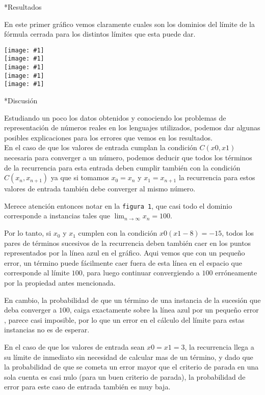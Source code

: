 \documentclass[12pt,titlepage]{article}
\newcommand{\gra}[1]{\noindent\texttt{[image: \#1]}\\}
\newenvironment{usection}[1]{\newpage\begin{section}*{#1}	\addcontentsline{toc}{section}{#1}}{\end{section}}
\begin{document}
	\begin{usection}{Resultados}

		En este primer gráfico vemos claramente cuales son los dominios
		del límite de la fórmula cerrada para los distintos límites
		que esta puede dar.

		\gra{lim5.png}
		
		\gra{fig_2_8_20.png}
		
		\gra{fig_4_4-25_20.png}
		
		\gra{fig_4_4-25_10.png}
		
		\gra{fig_5_5_20.png}

	\end{usection}
	
	\begin{usection}{Discusión}

		Estudiando un poco los datos obtenidos
		y conociendo los problemas de representación de números reales
		en los lenguajes utilizados, podemos dar algunas posibles explicaciones
		para los errores que vemos en los resultados. \\

		En el caso de que los valores de entrada cumplan la condición $C(x0,x1)$
		necesaria para converger a un número, podemos deducir que
		todos los términos de la recurrencia para esta entrada
		deben cumplir también con la condición $C(x_n,x_{n+1})$ ya que
		si tomamos $x_0 = x_n$ y $x_1 = x_{n+1}$ la recurrencia
		para estos valores de entrada también debe converger al mismo número.

		Merece atención entonces notar en la \texttt{figura 1},
		que casi todo el dominio corresponde a instancias
		tales que $\lim_{n\to\infty} x_n = 100$. 

		Por lo tanto, si $x_0$ y $x_1$ cumplen con la condición $x0(x1-8) = -15$,
		todos los pares de términos sucesivos de la recurrencia
		deben también caer en los puntos representados
		por la línea azul en el gráfico. Aqui vemos que con un pequeño error,
		un término puede fácilmente caer fuera de esta línea
		en el espacio que corresponde al límite $100$, para luego
		continuar convergiendo a $100$ erróneamente por la propiedad antes mencionada.

		En cambio, la probabilidad de que un término de una instancia
		de la sucesión que deba converger a $100$, caiga exactamente
		sobre la línea azul por un pequeño error , parece casi imposible,
		por lo que un error en el cálculo del límite para estas instancias no es de esperar.

		En el caso de que los valores de entrada sean $x0 = x1 = 3$,
		la recurrencia llega a su límite de inmediato
		sin necesidad de calcular mas de un término,
		y dado que la probabilidad de que se cometa un error
		mayor que el criterio de parada en una sola cuenta es casi nulo
		(para un buen criterio de parada), la probabilidad de error
		para este caso de entrada también es muy baja.


\end{usection}
\end{document}
